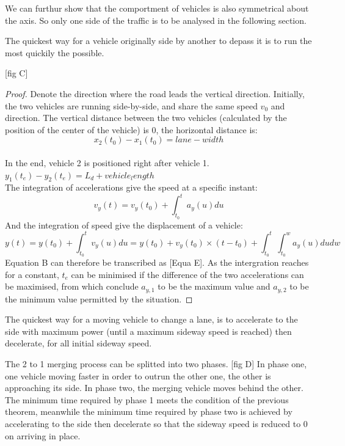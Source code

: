 \documentclass{mcmthesis}
\begin{document}
We can furthur show that the comportment of vehicles is also symmetrical about the axis. So only one side of the traffic is to be analysed in the following section.

\begin{Theorem} \label{thm:yingsongsheng2}
The quickest way for a vehicle originally side by another to depass it is to run the most quickily the possible.
\end{Theorem}

[fig C]

\begin{proof}
Denote the direction where the road leads the vertical direction.
Initially, the two vehicles are running side-by-side, and share the same speed $v_0$ and direction.
The vertical distance between the two vehicles (calculated by the position of the center of the vehicle) is 0, the horizontal distance is: $$x_2(t_0)-x_1(t_0)=lane-width$$\\
In the end, vehicle 2 is positioned right after vehicle 1.
$y_1(t_e)-y_2(t_e)=L_d+vehicle_length$\\
The integration of accelerations give the speed at a specific instant:
 $$v_y(t)=v_y(t_0)+ \int_{t_0}^{t}a_y(u)du$$
And the integration of speed give the displacement of a vehicle:
$$y(t)=y(t_0)+ \int_{t_0}^{t}v_y(u)du=y(t_0)+v_y(t_0) \times (t-t_0)+ \int_{t_0}^{t}\int_{t_0}^{w}a_y(u)dudw$$
Equation B can therefore be transcribed as 
[Equa E].
As the intergration reaches for a constant, $t_e$ can be minimised if the difference of the two accelerations can be maximised, from which conclude $a_{y,1}$ to be the maximum value and $a_{y,2}$ to be the minimum value permitted by the situation.
\end{proof}

\begin{Theorem} \label{thm:yingsongsheng3}
The quickest way for a moving vehicle to change a lane, is to accelerate to the side with maximum power (until a maximum sideway speed is reached) then decelerate, for all initial sideway speed.
\end{Theorem}

The 2 to 1 merging process can be splitted into two phases. [fig D] In phase one, one vehicle moving faster in order to outrun the other one, the other is approaching its side. In phase two, the merging vehicle moves behind the other. The minimum time required by phase 1 meets the condition of the previous theorem, meanwhile the minimum time required by phase two is achieved by accelerating to the side then decelerate so that the sideway speed is reduced to 0 on arriving in place.
\end{document}
